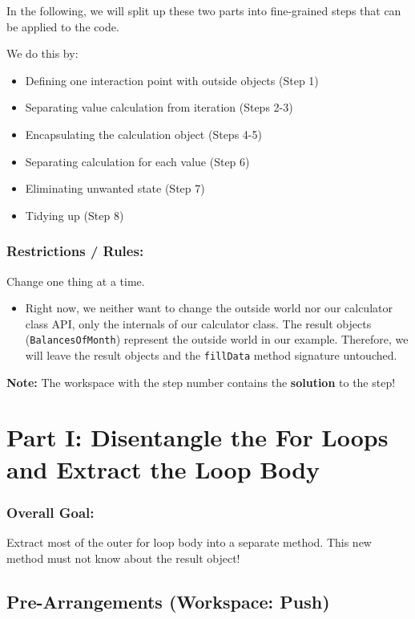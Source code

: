\documentclass[a4paper,fleqn,titlepage,11pt]{article}
\begin{document}
In the following, we will split up these two parts into fine-grained steps that can be applied to the code.

We do this by:
\begin{itemize}
	\item Defining one interaction point with outside objects (Step 1)
	\item Separating value calculation from iteration (Steps 2-3)
	\item Encapsulating the calculation object (Steps 4-5)
	\item Separating calculation for each value (Step 6)
	\item Eliminating unwanted state (Step 7)
	\item Tidying up (Step 8)
\end{itemize}

\subsubsection*{Restrictions / Rules:}

Change one thing at a time.

\begin{itemize}
\item Right now, we neither want to change the outside world nor our calculator class API, only the internals of our calculator class. The result objects (\texttt{BalancesOfMonth}) represent the outside world in our example. Therefore, we will leave the result objects and the \texttt{fillData} method signature untouched. 
\end{itemize}


\textbf{Note:} The workspace with the step number contains the \textbf{solution} to the step!

\section*{Part I: Disentangle the For Loops and Extract the Loop Body}

\subsubsection*{Overall Goal:}

Extract most of the outer for loop body into a separate method. This new method must not know about the result object!

\subsection*{Pre-Arrangements (Workspace: Push)}
\end{document}
